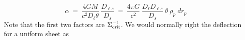 \begin{equation}
  \alpha \ =\ \frac{4GM}{c^2 D_\ell \theta}\ \frac{D_{\ell s}}{D_s}
  \ =\ \frac{4\pi G}{c^2}\ \frac{D_\ell D_{\ell s}}{D_s}\ \theta\ \rho_p\ dr_p
\end{equation}
Note that the first two factors are $\Sigma_{\rm crit}^{-1}$.  We would normally right the deflection for a uniform sheet as